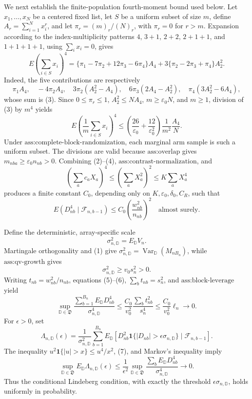 We next establish the finite-population fourth-moment bound used below. Let \(x_1,\ldots,x_N\) be a centered fixed list, let \(S\) be a uniform subset of size \(m\), define \(A_r=\sum_{i=1}^Nx_i^r\), and let \(\pi_r=(m)_r/(N)_r\), with \(\pi_r=0\) for \(r>m\). Expansion according to the index-multiplicity patterns \(4\), \(3+1\), \(2+2\), \(2+1+1\), and \(1+1+1+1\), using \(\sum_ix_i=0\), gives
\[
E\left(\sum_{i\in S}x_i\right)^4
=\{\pi_1-7\pi_2+12\pi_3-6\pi_4\}A_4
+3\{\pi_2-2\pi_3+\pi_4\}A_2^2.
\tag{3}
\]
Indeed, the five contributions are respectively
\[
\pi_1A_4,\quad -4\pi_2A_4,\quad
3\pi_2(A_2^2-A_4),\quad
6\pi_3(2A_4-A_2^2),\quad
\pi_4(3A_2^2-6A_4),
\]
whose sum is (3). Since \(0\le\pi_r\le1\), \(A_2^2\le NA_4\), \(m\ge\varepsilon_0N\), and \(m\ge1\), division of (3) by \(m^4\) yields
\[
E\left(\frac1m\sum_{i\in S}x_i\right)^4
\le\left(\frac{26}{\varepsilon_0}+\frac{12}{\varepsilon_0^2}\right)
\frac1{m^2}\frac{A_4}{N}.
\tag{4}
\]
Under \(\text{ass:complete-block-randomization}\), each marginal arm sample is such a uniform subset. The divisions are valid because \(\text{ass:overlap}\) gives \(m_{nba}\ge\varepsilon_0n_{nb}>0\). Combining (2)--(4), \(\text{ass:contrast-normalization}\), and
\[
\left(\sum_ac_aX_a\right)^4
\le\left(\sum_aX_a^2\right)^2
\le K\sum_aX_a^4
\]
produces a finite constant \(C_0\), depending only on \(K,\varepsilon_0,\delta_0,C_R\), such that
\[
E(D_{nb}^4\mid\mathcal F_{n,b-1})
\le C_0\left(\frac{w_{nb}^2}{n_{nb}}\right)^2
\quad\text{almost surely}.
\tag{5}
\]

Define the deterministic, array-specific scale
\[
\sigma_{n,\mathbb D}^2=E_{\mathbb D}V_n.
\]
Martingale orthogonality and (1) give \(\sigma_{n,\mathbb D}^2=\operatorname{Var}_{\mathbb D}(M_{nB_n})\), while \(\text{ass:qv-growth}\) gives
\[
\sigma_{n,\mathbb D}^2\ge v_0s_n^2>0.
\tag{6}
\]
Writing \(t_{nb}=w_{nb}^2/n_{nb}\), equations (5)--(6), \(\sum_bt_{nb}=s_n^2\), and \(\text{ass:block-leverage}\) yield
\[
\sup_{\mathbb D\in\mathfrak D}
\frac{\sum_{b=1}^{B_n}E_{\mathbb D}D_{nb}^4}{\sigma_{n,\mathbb D}^4}
\le\frac{C_0}{v_0^2}\frac{\sum_bt_{nb}^2}{s_n^4}
\le\frac{C_0}{v_0^2}\ell_n\longrightarrow0.
\tag{7}
\]
For \(\epsilon>0\), set
\[
\Lambda_{n,\mathbb D}(\epsilon)
=\frac1{\sigma_{n,\mathbb D}^2}\sum_{b=1}^{B_n}
E_{\mathbb D}\!\left[D_{nb}^2\mathbf1\{|D_{nb}|>\epsilon\sigma_{n,\mathbb D}\}
\mid\mathcal F_{n,b-1}\right].
\]
The inequality \(u^2\mathbf1\{|u|>x\}\le u^4/x^2\), (7), and Markov's inequality imply
\[
\sup_{\mathbb D\in\mathfrak D}E_{\mathbb D}\Lambda_{n,\mathbb D}(\epsilon)
\le\frac1{\epsilon^2}
\sup_{\mathbb D\in\mathfrak D}
\frac{\sum_bE_{\mathbb D}D_{nb}^4}{\sigma_{n,\mathbb D}^4}
\longrightarrow0.
\tag{8}
\]
Thus the conditional Lindeberg condition, with exactly the threshold \(\epsilon\sigma_{n,\mathbb D}\), holds uniformly in probability.

